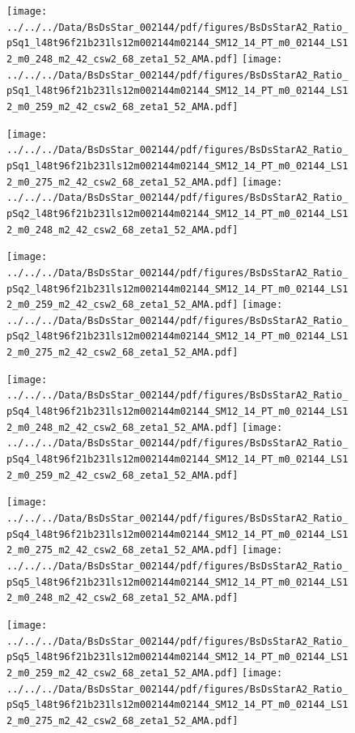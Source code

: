 \documentclass[a4paper,10pt]{article}
\begin{document}
\begin{figure}[p]
 \texttt{[image: ../../../Data/BsDsStar\_002144/pdf/figures/BsDsStarA2\_Ratio\_pSq1\_l48t96f21b231ls12m002144m02144\_SM12\_14\_PT\_m0\_02144\_LS12\_m0\_248\_m2\_42\_csw2\_68\_zeta1\_52\_AMA.pdf]} 
 \texttt{[image: ../../../Data/BsDsStar\_002144/pdf/figures/BsDsStarA2\_Ratio\_pSq1\_l48t96f21b231ls12m002144m02144\_SM12\_14\_PT\_m0\_02144\_LS12\_m0\_259\_m2\_42\_csw2\_68\_zeta1\_52\_AMA.pdf]} 
 \end{figure}
\begin{figure}[p]
 \texttt{[image: ../../../Data/BsDsStar\_002144/pdf/figures/BsDsStarA2\_Ratio\_pSq1\_l48t96f21b231ls12m002144m02144\_SM12\_14\_PT\_m0\_02144\_LS12\_m0\_275\_m2\_42\_csw2\_68\_zeta1\_52\_AMA.pdf]} 
 \texttt{[image: ../../../Data/BsDsStar\_002144/pdf/figures/BsDsStarA2\_Ratio\_pSq2\_l48t96f21b231ls12m002144m02144\_SM12\_14\_PT\_m0\_02144\_LS12\_m0\_248\_m2\_42\_csw2\_68\_zeta1\_52\_AMA.pdf]} 
 \end{figure}
\begin{figure}[p]
 \texttt{[image: ../../../Data/BsDsStar\_002144/pdf/figures/BsDsStarA2\_Ratio\_pSq2\_l48t96f21b231ls12m002144m02144\_SM12\_14\_PT\_m0\_02144\_LS12\_m0\_259\_m2\_42\_csw2\_68\_zeta1\_52\_AMA.pdf]} 
 \texttt{[image: ../../../Data/BsDsStar\_002144/pdf/figures/BsDsStarA2\_Ratio\_pSq2\_l48t96f21b231ls12m002144m02144\_SM12\_14\_PT\_m0\_02144\_LS12\_m0\_275\_m2\_42\_csw2\_68\_zeta1\_52\_AMA.pdf]} 
 \end{figure}
\clearpage
\begin{figure}[p]
 \texttt{[image: ../../../Data/BsDsStar\_002144/pdf/figures/BsDsStarA2\_Ratio\_pSq4\_l48t96f21b231ls12m002144m02144\_SM12\_14\_PT\_m0\_02144\_LS12\_m0\_248\_m2\_42\_csw2\_68\_zeta1\_52\_AMA.pdf]} 
 \texttt{[image: ../../../Data/BsDsStar\_002144/pdf/figures/BsDsStarA2\_Ratio\_pSq4\_l48t96f21b231ls12m002144m02144\_SM12\_14\_PT\_m0\_02144\_LS12\_m0\_259\_m2\_42\_csw2\_68\_zeta1\_52\_AMA.pdf]} 
 \end{figure}
\begin{figure}[p]
 \texttt{[image: ../../../Data/BsDsStar\_002144/pdf/figures/BsDsStarA2\_Ratio\_pSq4\_l48t96f21b231ls12m002144m02144\_SM12\_14\_PT\_m0\_02144\_LS12\_m0\_275\_m2\_42\_csw2\_68\_zeta1\_52\_AMA.pdf]} 
 \texttt{[image: ../../../Data/BsDsStar\_002144/pdf/figures/BsDsStarA2\_Ratio\_pSq5\_l48t96f21b231ls12m002144m02144\_SM12\_14\_PT\_m0\_02144\_LS12\_m0\_248\_m2\_42\_csw2\_68\_zeta1\_52\_AMA.pdf]} 
 \end{figure}
\begin{figure}[p]
 \texttt{[image: ../../../Data/BsDsStar\_002144/pdf/figures/BsDsStarA2\_Ratio\_pSq5\_l48t96f21b231ls12m002144m02144\_SM12\_14\_PT\_m0\_02144\_LS12\_m0\_259\_m2\_42\_csw2\_68\_zeta1\_52\_AMA.pdf]} 
 \texttt{[image: ../../../Data/BsDsStar\_002144/pdf/figures/BsDsStarA2\_Ratio\_pSq5\_l48t96f21b231ls12m002144m02144\_SM12\_14\_PT\_m0\_02144\_LS12\_m0\_275\_m2\_42\_csw2\_68\_zeta1\_52\_AMA.pdf]} 
 \end{figure}
\clearpage
\clearpage
\end{document}
